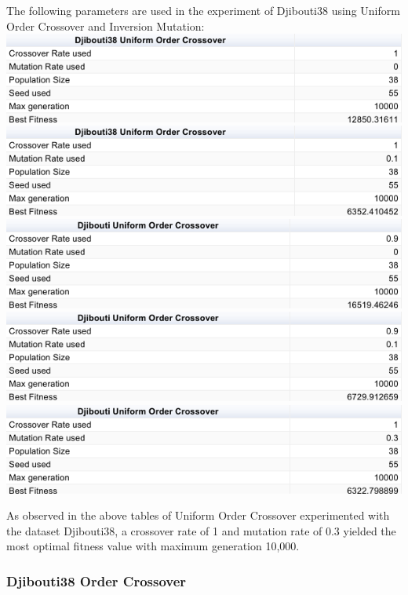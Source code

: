 \documentclass[conference]{IEEEtran}
\begin{document}
The following parameters are used in the experiment of Djibouti38 using Uniform Order Crossover and Inversion Mutation:
\includegraphics[scale=0.42]{Djibouti38/UOC/Djibouti38_UOC_a)_table}
\includegraphics[scale=0.42]{Djibouti38/UOC/Djibouti38_UOC_b)_table}
\includegraphics[scale=0.42]{Djibouti38/UOC/Djibouti38_UOC_c)_table}
\includegraphics[scale=0.42]{Djibouti38/UOC/Djibouti38_UOC_d)_table}
\includegraphics[scale=0.42]{Djibouti38/UOC/Djibouti38_UOC_e)_table}

As observed in the above tables of Uniform Order Crossover experimented with the dataset Djibouti38, a crossover rate of 1 and mutation rate of 0.3 yielded the most optimal fitness value with maximum generation 10,000. 

\subsubsection{Djibouti38 Order Crossover}
\end{document}
